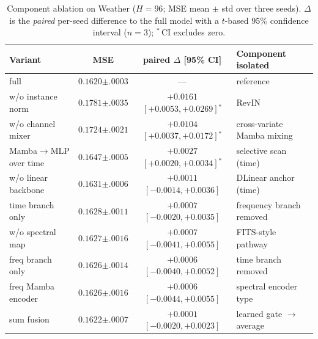 \documentclass[review,12pt]{elsarticle}
\begin{document}
\begin{table}[tb]
\centering
\caption{Component ablation on Weather ($H{=}96$; MSE mean $\pm$ std over
three seeds). $\Delta$ is the \emph{paired} per-seed difference to the
full model with a $t$-based 95\% confidence interval ($n{=}3$);
$^{*}$\,CI excludes zero.}
\label{tab:ablation_weather}
\scriptsize
\setlength{\tabcolsep}{3pt}
\begin{tabular}{@{}lccl@{}}
\toprule
Variant & MSE & paired $\Delta$ [95\% CI] & Component isolated \\
\midrule
full & $0.1620{\scriptstyle\pm.0003}$ & --- & reference \\
\;\;w/o instance norm & $0.1781{\scriptstyle\pm.0035}$ & $+0.0161$ $[+0.0053,+0.0269]$$^{*}$ & RevIN \\
\;\;w/o channel mixer & $0.1724{\scriptstyle\pm.0021}$ & $+0.0104$ $[+0.0037,+0.0172]$$^{*}$ & cross-variate Mamba mixing \\
\;\;Mamba$\rightarrow$MLP over time & $0.1647{\scriptstyle\pm.0005}$ & $+0.0027$ $[+0.0020,+0.0034]$$^{*}$ & selective scan (time) \\
\;\;w/o linear backbone & $0.1631{\scriptstyle\pm.0006}$ & $+0.0011$ $[-0.0014,+0.0036]$ & DLinear anchor (time) \\
\;\;time branch only & $0.1628{\scriptstyle\pm.0011}$ & $+0.0007$ $[-0.0020,+0.0035]$ & frequency branch removed \\
\;\;w/o spectral map & $0.1627{\scriptstyle\pm.0016}$ & $+0.0007$ $[-0.0041,+0.0055]$ & FITS-style pathway \\
\;\;freq branch only & $0.1626{\scriptstyle\pm.0014}$ & $+0.0006$ $[-0.0040,+0.0052]$ & time branch removed \\
\;\;freq Mamba encoder & $0.1626{\scriptstyle\pm.0016}$ & $+0.0006$ $[-0.0044,+0.0055]$ & spectral encoder type \\
\;\;sum fusion & $0.1622{\scriptstyle\pm.0007}$ & $+0.0001$ $[-0.0020,+0.0023]$ & learned gate $\rightarrow$ average \\
\bottomrule
\end{tabular}
\end{table}
\end{document}
